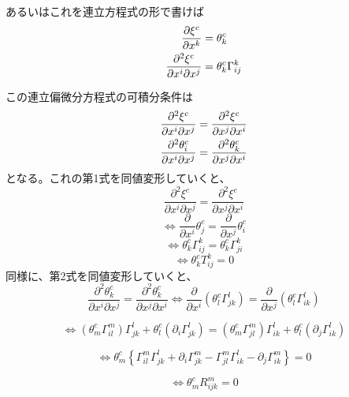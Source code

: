 \documentclass[a4paper,11pt]{jsarticle}
\numberwithin{equation}{section}
\begin{document}
    あるいはこれを連立方程式の形で書けば
    \begin{align}
        \frac{\partial \xi^c}{\partial x^k} &= \theta^c_k \\
        \pdv{\xi^c}{x^i}{x^j} &= \theta^c_k \Gamma^k_{ij}
    \end{align}

この連立偏微分方程式の可積分条件は
    \begin{align}
        \pdv[2]{\xi^c}{x^i}{x^j} &= \pdv[2]{\xi^c}{x^j}{x^i} \\
        \pdv[2]{\theta^c_i}{x^i}{x^j} &= \pdv[2]{\theta^c_k}{x^j}{x^i}
    \end{align}
となる。これの第1式を同値変形していくと、
\begin{equation}
    \frac{\partial^2 \xi^c}{\partial x^i \partial x^j} = \frac{\partial^2 \xi^c}{\partial x^j \partial x^i}
\end{equation}
\begin{equation}
    \Leftrightarrow \frac{\partial}{\partial x^i} \theta^c_j = \frac{\partial}{\partial x^j} \theta^c_i
\end{equation}
\begin{equation}
    \Leftrightarrow \theta^c_k \Gamma^k_{ij} = \theta^c_k \Gamma^k_{ji}
\end{equation}
\begin{equation}
    \Leftrightarrow \theta^c_k T^k_{ij} = 0
\end{equation}
同様に、第2式を同値変形していくと、
\begin{equation}
    \frac{\partial^2 \theta^c_k}{\partial x^i \partial x^j} = \frac{\partial^2 \theta^c_k}{\partial x^j \partial x^i} \iff \frac{\partial}{\partial x^i} (\theta^c_l \Gamma^l_{jk}) = \frac{\partial}{\partial x^j} (\theta^c_l \Gamma^l_{ik})
\end{equation}

\begin{equation}
    \iff (\theta^c_m \Gamma^m_{il}) \Gamma^l_{jk} + \theta^c_l \left( \partial_i \Gamma^l_{jk} \right) = (\theta^c_m \Gamma^m_{jl}) \Gamma^l_{ik} + \theta^c_l \left( \partial_j \Gamma^l_{ik} \right)
\end{equation}

\begin{equation}
    \iff \theta^c_m \left\{ \Gamma^m_{il} \Gamma^l_{jk} + \partial_i \Gamma^m_{jk} - \Gamma^m_{jl} \Gamma^l_{ik} - \partial_j \Gamma^m_{ik} \right\} = 0
\end{equation}

\begin{equation}
    \iff \theta^c_m R^m_{ijk} = 0
\end{equation}
\end{document}
